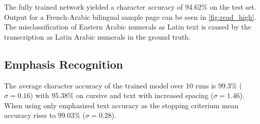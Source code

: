 The fully trained network yielded a character accuracy of 94.62\% on the test
set. Output for a French-Arabic bilingual sample page can be seen in
\ref{fig:read_high}. The misclassification of Eastern Arabic numerals as Latin
text is caused by the transcription as Latin Arabic numerals in the ground
truth.

\subsection{Emphasis Recognition}

The average character accuracy of the trained model over 10 runs is 99.3\%
($\sigma=0.16$) with 95.38\% on cursive and text with increased spacing
($\sigma=1.46$). When using only emphasized text accuracy as the stopping
criterium mean accuracy rises to 99.03\% ($\sigma=0.28$).
